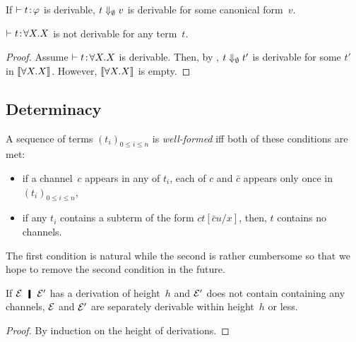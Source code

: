    \begin{corollary}
    \label{convergence}
    If $\vdash{t} \mathord{\colon\kern -2pt}{\varphi}$ is derivable,
    $t\Downarrow_{\emptyset} v$ is derivable for some canonical form~$v$.
   \end{corollary}

   \begin{corollary}
    $\vdash{t} \mathord{\colon\kern -2pt}{\forall X.X}$ is not derivable for any term~$t$.
   \end{corollary}
    \begin{proof}
     Assume $\vdash{t} \mathord{\colon\kern -2pt}{\forall X.X}$ is derivable.
     Then, by ,
     $t\Downarrow_\emptyset t'$ is derivable for some $t'$ in $\llbracket{\forall X.X}\rrbracket$.
     However, $\llbracket{\forall X.X}\rrbracket$ is empty.
    \end{proof}

    \subsection{Determinacy}

    A sequence of terms $(t_i)_{0\le i \le n}$ is
    \textit{well-formed} iff both
    of these conditions are met:
    \begin{itemize}
     \item if a channel~$c$ appears in any of $t_i$,
	   each of $c$ and $\bar c$ appears only once in $(t_i)_{0\le i
	   \le n}$,
     \item if any $t_i$ contains a subterm of the form $ct[\bar cu/x]$,
	   then, $t$ contains no channels.
    \end{itemize}
    The first condition is natural while the second is rather
    cumbersome so that we hope to remove the second condition in the
    future.

    \begin{proposition}
     \label{remove-local}
     If $\hypere\hmid \hypere'$ has a derivation of height~$h$ and
     $\mathcal{E}'$ does not contain
     containing any channels, $\mathcal{E}$ and $\mathcal{E}'$ are separately
     derivable within height~$h$ or less.
    \end{proposition}
    \begin{proof}
     By induction on the height of derivations.
    \end{proof}

